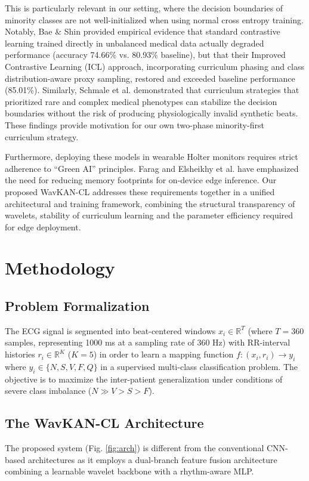 \documentclass[journal,twoside,web]{ieeecolor}
\begin{document}
This is particularly relevant in our setting, where the decision boundaries of minority classes are not well-initialized when using normal cross entropy training. Notably, Bae \& Shin \cite{bae_handling_2025} provided empirical evidence that standard contrastive learning trained directly in unbalanced medical data actually degraded performance (accuracy 74.66\% vs. 80.93\% baseline), but that their Improved Contrastive Learning (ICL) approach, incorporating curriculum phasing and class distribution-aware proxy sampling, restored and exceeded baseline performance (85.01\%). Similarly, Schmale et al. \cite{schmale_curriculum_2025} demonstrated that curriculum strategies that prioritized rare and complex medical phenotypes can stabilize the decision boundaries without the risk of producing physiologically invalid synthetic beats. These findings provide motivation for our own two-phase minority-first curriculum strategy.

Furthermore, deploying these models in wearable Holter monitors requires strict adherence to ``Green AI'' principles. Farag \cite{farag_tiny_2023} and Elsheikhy et al. \cite{elsheikhy_lightweight_2025} have emphasized the need for reducing memory footprints for on-device edge inference. Our proposed WavKAN-CL addresses these requirements together in a unified architectural and training framework, combining the structural transparency of wavelets, stability of curriculum learning and the parameter efficiency required for edge deployment.

\section{Methodology}
\label{sec:methods}

\subsection{Problem Formalization}
The ECG signal is segmented into beat-centered windows $x_i \in \mathbb{R}^T$ (where $T=360$ samples, representing 1000 ms at a sampling rate of 360 Hz) with RR-interval histories $r_i \in \mathbb{R}^K$ ($K=5$) in order to learn a mapping function $f : (x_i, r_i) \to y_i$ where $y_i \in \{N, S, V, F, Q\}$ in a supervised multi-class classification problem. The objective is to maximize the inter-patient generalization under conditions of severe class imbalance ($N \gg V > S > F$).

\subsection{The WavKAN-CL Architecture}
The proposed system (Fig. \ref{fig:arch}) is different from the conventional CNN-based architectures as it employs a dual-branch feature fusion architecture combining a learnable wavelet backbone with a rhythm-aware MLP.
\end{document}
